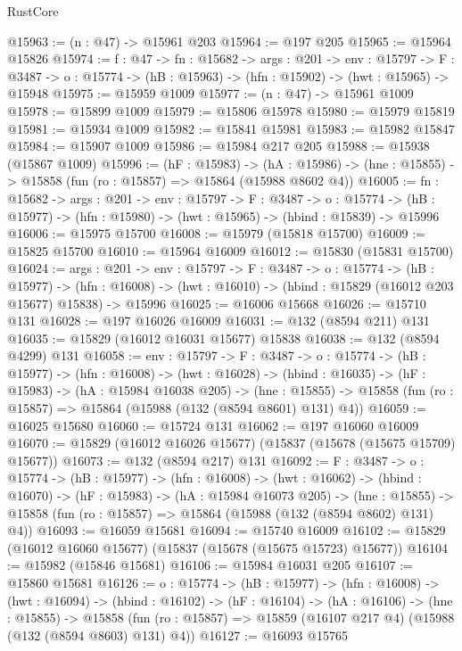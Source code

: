 \begin{lexlean}{RustCore}
\begin{coremodule}
@15963 := (n : @47) -> @15961 @203
@15964 := @197 @205
@15965 := @15964 @15826
@15974 := {f : @47} ->
  {fn : @15682} ->
  {args : @201} ->
  {env : @15797} ->
  {F : @3487} -> {o : @15774} -> (hB : @15963) -> (hfn : @15902) -> (hwt : @15965) -> @15948
@15975 := @15959 @1009
@15977 := (n : @47) -> @15961 @1009
@15978 := @15899 @1009
@15979 := @15806 @15978
@15980 := @15979 @15819
@15981 := @15934 @1009
@15982 := @15841 @15981
@15983 := @15982 @15847
@15984 := @15907 @1009
@15986 := @15984 @217 @205
@15988 := @15938 (@15867 @1009)
@15996 := (hF : @15983) ->
  (hA : @15986) -> (hne : @15855) -> @15858 (fun (ro : @15857) => @15864 (@15988 @8602 @4))
@16005 := {fn : @15682} ->
  {args : @201} ->
  {env : @15797} ->
  {F : @3487} ->
  {o : @15774} -> (hB : @15977) -> (hfn : @15980) -> (hwt : @15965) -> (hbind : @15839) -> @15996
@16006 := @15975 @15700
@16008 := @15979 (@15818 @15700)
@16009 := @15825 @15700
@16010 := @15964 @16009
@16012 := @15830 (@15831 @15700)
@16024 := {args : @201} ->
  {env : @15797} ->
  {F : @3487} ->
  {o : @15774} ->
  (hB : @15977) ->
  (hfn : @16008) -> (hwt : @16010) -> (hbind : @15829 (@16012 @203 @15677) @15838) -> @15996
@16025 := @16006 @15668
@16026 := @15710 @131
@16028 := @197 @16026 @16009
@16031 := @132 (@8594 @211) @131
@16035 := @15829 (@16012 @16031 @15677) @15838
@16038 := @132 (@8594 @4299) @131
@16058 := {env : @15797} ->
  {F : @3487} ->
  {o : @15774} ->
  (hB : @15977) ->
  (hfn : @16008) ->
  (hwt : @16028) ->
  (hbind : @16035) ->
  (hF : @15983) ->
  (hA : @15984 @16038 @205) ->
  (hne : @15855) -> @15858 (fun (ro : @15857) => @15864 (@15988 (@132 (@8594 @8601) @131) @4))
@16059 := @16025 @15680
@16060 := @15724 @131
@16062 := @197 @16060 @16009
@16070 := @15829 (@16012 @16026 @15677) (@15837 (@15678 (@15675 @15709) @15677))
@16073 := @132 (@8594 @217) @131
@16092 := {F : @3487} ->
  {o : @15774} ->
  (hB : @15977) ->
  (hfn : @16008) ->
  (hwt : @16062) ->
  (hbind : @16070) ->
  (hF : @15983) ->
  (hA : @15984 @16073 @205) ->
  (hne : @15855) -> @15858 (fun (ro : @15857) => @15864 (@15988 (@132 (@8594 @8602) @131) @4))
@16093 := @16059 @15681
@16094 := @15740 @16009
@16102 := @15829 (@16012 @16060 @15677) (@15837 (@15678 (@15675 @15723) @15677))
@16104 := @15982 (@15846 @15681)
@16106 := @15984 @16031 @205
@16107 := @15860 @15681
@16126 := {o : @15774} ->
  (hB : @15977) ->
  (hfn : @16008) ->
  (hwt : @16094) ->
  (hbind : @16102) ->
  (hF : @16104) ->
  (hA : @16106) ->
  (hne : @15855) ->
  @15858 (fun (ro : @15857) => @15859 (@16107 @217 @4) (@15988 (@132 (@8594 @8603) @131) @4))
@16127 := @16093 @15765

\end{coremodule}
\end{lexlean}
